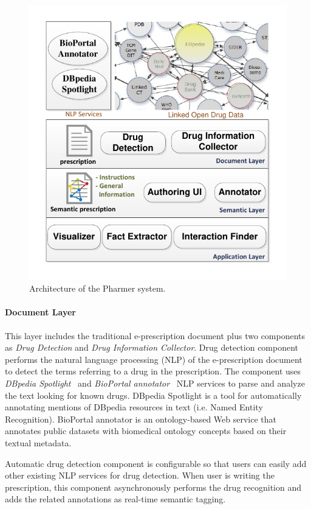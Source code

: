 \documentclass[journal]{IEEEtran}
\begin{document}
\begin{figure}[tb]
	\centering
		\includegraphics[width=1\columnwidth]{images/architecture.pdf}
	\caption{Architecture of the Pharmer system.}
	\label{fig:arch}
\end{figure}

\paragraph{Document Layer} This layer includes the traditional e-prescription document plus two components as \emph{Drug Detection} and \emph{Drug Information Collector}.
Drug detection component performs the natural language processing (NLP) of the e-prescription document to detect the terms referring to a drug in the prescription.
The component uses \emph{DBpedia Spotlight}~\cite{dbspotlight} and \emph{BioPortal annotator}~\cite{bioportal} NLP services to parse and analyze the text looking for known drugs.
DBpedia Spotlight is a tool for automatically annotating mentions of DBpedia resources in text (i.e. Named Entity Recognition).
BioPortal annotator is an ontology-based Web service that annotates public datasets with biomedical ontology concepts based on their textual metadata.

Automatic drug detection component is configurable so that users can easily add other existing NLP services for drug detection.
When user is writing the prescription, this component asynchronously performs the drug recognition and adds the related annotations as real-time semantic tagging.
\end{document}

